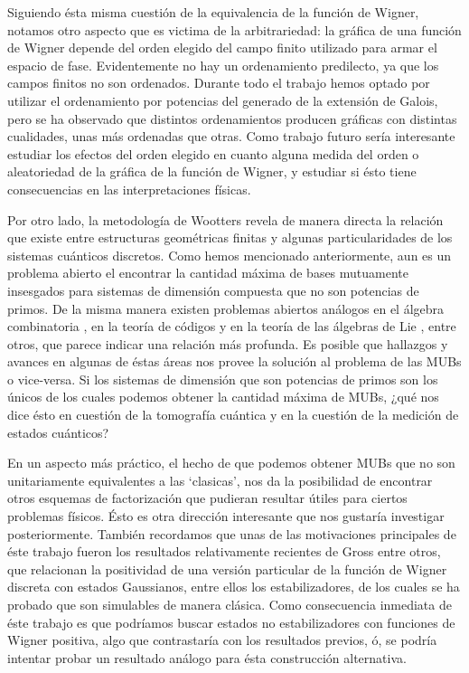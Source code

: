 \documentclass[a4paper]{report}
\begin{document}
  Siguiendo ésta misma cuestión de la equivalencia de la
  función de Wigner, notamos otro aspecto que es victima de
  la arbitrariedad: la gráfica de una función de Wigner
  depende del orden elegido del campo finito utilizado para
  armar el espacio de fase. Evidentemente no hay un
  ordenamiento predilecto, ya que los campos finitos no son
  ordenados. Durante todo el trabajo hemos optado por
  utilizar el ordenamiento por potencias del generado de la
  extensión de Galois, pero se ha observado que distintos
  ordenamientos producen gráficas con distintas cualidades,
  unas más ordenadas que otras. Como trabajo futuro sería
  interesante estudiar los efectos del orden elegido en
  cuanto alguna medida del orden o aleatoriedad de la
  gráfica de la función de Wigner, y estudiar si ésto tiene
  consecuencias en las interpretaciones físicas.

  Por otro lado, la metodología de Wootters revela de manera
  directa la relación que existe entre estructuras
  geométricas finitas y algunas particularidades de los
  sistemas cuánticos discretos. Como hemos mencionado
  anteriormente, aun es un problema abierto el encontrar la
  cantidad máxima de bases mutuamente insesgados para
  sistemas de dimensión compuesta que no son potencias de
  primos. De la misma manera existen problemas abiertos
  análogos en el álgebra combinatoria \cite{kantor2003}, en
  la teoría de códigos \cite{kantor1982} y en la teoría de
  las álgebras de Lie \cite{ivanov1987, kantor1996,
  boykin2005}, entre otros, que parece indicar una relación
  más profunda. Es posible que hallazgos y avances en
  algunas de éstas áreas nos provee la solución al problema
  de las MUBs o vice-versa. Si los sistemas de dimensión que
  son potencias de primos son los únicos de los cuales
  podemos obtener la cantidad máxima de MUBs, ¿qué nos dice
  ésto en cuestión de la tomografía cuántica y en la
  cuestión de la medición de estados cuánticos?

  En un aspecto más práctico, el hecho de que podemos
  obtener MUBs que no son unitariamente equivalentes a las
  `clasicas', nos da la posibilidad de encontrar otros
  esquemas de factorización que pudieran resultar útiles
  para ciertos problemas físicos. Ésto es otra dirección
  interesante que nos gustaría investigar posteriormente.
  También recordamos que unas de las motivaciones
  principales de éste trabajo fueron los resultados
  relativamente recientes de Gross \cite{gross2006} entre
  otros, que relacionan la positividad de una versión
  particular de la función de Wigner discreta con estados
  Gaussianos, entre ellos los estabilizadores, de los cuales
  se ha probado que son simulables de manera clásica. Como
  consecuencia inmediata de éste trabajo es que podríamos
  buscar estados no estabilizadores con funciones de Wigner
  positiva, algo que contrastaría con los resultados
  previos, ó, se podría intentar probar un resultado análogo
  para ésta construcción alternativa.

  \newpage
  \appendix

  \newpage
  \printbibliography
\end{document}
